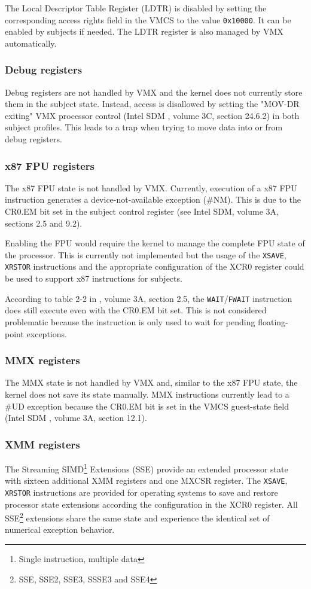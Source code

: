 The Local Descriptor Table Register (LDTR) is disabled by setting
the corresponding access rights field in the VMCS to the value \texttt{0x10000}.
It can be enabled by subjects if needed. The LDTR register is also managed by
VMX automatically.

\subsubsection{Debug registers}
Debug registers are not handled by VMX and the kernel does not currently store
them in the subject state. Instead, access is disallowed by setting the "MOV-DR
exiting" VMX processor control (Intel SDM \cite{IntelSDM}, volume 3C, section
24.6.2) in both subject profiles. This leads to a trap when trying to move data
into or from debug registers.

\subsubsection{x87 FPU registers}
The x87 FPU state is not handled by VMX. Currently, execution of a x87 FPU
instruction generates a device-not-available exception (\#NM). This is due to
the CR0.EM bit set in the subject control register (see Intel SDM, volume 3A,
sections 2.5 and 9.2).

Enabling the FPU would require the kernel to manage the complete FPU state of
the processor. This is currently not implemented but the usage of the
\texttt{XSAVE}, \texttt{XRSTOR} instructions and the appropriate configuration
of the XCR0 register could be used to support x87 instructions for subjects.

According to table 2-2 in \cite{IntelSDM}, volume 3A, section 2.5, the
\texttt{WAIT}/\texttt{FWAIT} instruction does still execute even with the CR0.EM
bit set. This is not considered problematic because the instruction is only used
to wait for pending floating-point exceptions.

\subsubsection{MMX registers}
The MMX state is not handled by VMX and, similar to the x87 FPU state, the
kernel does not save its state manually. MMX instructions currently lead to a
\#UD exception because the CR0.EM bit is set in the VMCS guest-state field
(Intel SDM \cite{IntelSDM}, volume 3A, section 12.1).

\subsubsection{XMM registers}
The Streaming SIMD\footnote{Single instruction, multiple data}
Extensions (SSE) provide an extended processor state with sixteen
additional XMM registers and one MXCSR register. The \texttt{XSAVE},
\texttt{XRSTOR} instructions are provided for operating systems to save and
restore processor state extensions according the configuration in the XCR0
register. All SSE\footnote{SSE, SSE2, SSE3, SSSE3 and SSE4} extensions share
the same state and experience the identical set of numerical exception behavior.

